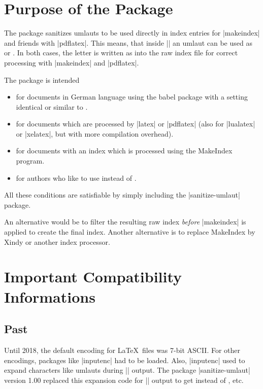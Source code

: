 \documentclass[a4paper,11pt]{ltxdoc}
\begin{document}
\clearpage
\section{Purpose of the Package}%
The package sanitizes umlauts to be used directly in index entries for
|makeindex| and friends with |pdflatex|. This means, that inside |\index| an umlaut can
be used as  or . In both cases, the letter is written
as  into the raw index file for correct processing with |makeindex|
and |pdflatex|.

The package is intended
\begin{itemize}
\item for documents in German language using the babel package with a setting
  identical or similar to \myverb{\usepackage[ngerman]{babel}}.
\item for documents which are processed by |latex| or |pdflatex| (also for |lualatex| or |xelatex|,
    but with more compilation overhead).
\item for documents with an index which is processed using the
  MakeIndex program.
\item for authors who like to use  instead of
  .
\end{itemize}

All these conditions are satisfiable by simply including the |sanitize-umlaut|
package.

An alternative would be to filter the resulting raw  index
\emph{before} |makeindex| is applied to create the final  index.
Another alternative is to replace MakeIndex by Xindy or another index
processor.

\clearpage
\section{Important Compatibility Informations}%

\subsection{Past}
Until 2018, the default encoding for \LaTeX\ files was 7-bit ASCII.
For other encodings, packages like |inputenc| had to be loaded.
Also, |inputenc| used to expand characters like umlauts during |\index| output.
The package |sanitize-umlaut| version 1.00 replaced this expansion code
for |\index| output to get  instead of , etc.
\end{document}
